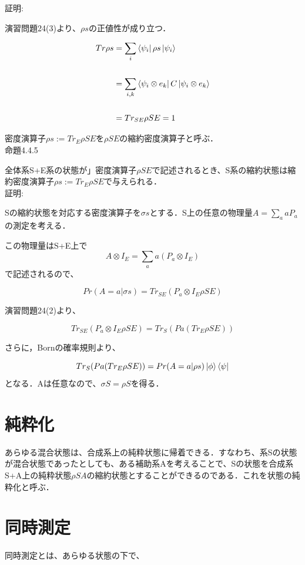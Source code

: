 \documentclass[xelatex,ja=standard,jafont=noto]{bxjsarticle}
\begin{document}
    証明:
    
    演習問題24(3)より、$\rho s$の正値性が成り立つ．
    
    \begin{equation}
        \begin{aligned}
            Tr \rho s&=\sum_{i}\bra{\psi_{i}}\rho s\ket{\psi_{i}}\\
            \\
            &=\sum_{i,k}\bra{\psi_{i}\otimes e_{k}}C\ket{\psi_{i}\otimes e_{k}}\\
            \\
            &=Tr_{SE}\rho SE=1
        \end{aligned}
    \end{equation}
    
密度演算子$\rho s:=Tr_{E}\rho SE$を$\rho SE$の縮約密度演算子と呼ぶ．\\


命題4.4.5

全体系S+E系の状態が」密度演算子$\rho SE$で記述されるとき、S系の縮約状態は縮約密度演算子$\rho s:=Tr_{E}\rho SE$で与えられる．\\

証明:

Sの縮約状態を対応する密度演算子を$\sigma s$とする．S上の任意の物理量$A=\sum_{a}aP_{a}$の測定を考える．

この物理量はS+E上で
\begin{equation}
    A\otimes I_{E}=\sum_{a}a(P_{a}\otimes　I_{E})
\end{equation}
で記述されるので、


\begin{equation}
    Pr(A=a|\sigma s)=Tr_{SE}(P_{a}\otimes　I_{E}\rho SE)
\end{equation}

演習問題24(2)より、

\begin{equation}
    Tr_{SE}(P_{a}\otimes　I_{E}\rho SE)=Tr_{S}(P{a}(Tr_{E}\rho SE))
\end{equation}

さらに，Bornの確率規則より、

\begin{equation}
    Tr_{S}(P{a}(Tr_{E}\rho SE))=Pr(A=a|\rho s)\ket{\phi}\bra{\psi}
\end{equation}
となる．Aは任意なので、$\sigma S=\rho S$を得る．\\


\section{純粋化}

あらゆる混合状態は、合成系上の純粋状態に帰着できる．すなわち、系Sの状態が混合状態であったとしても、ある補助系Aを考えることで、Sの状態を合成系S+A上の純粋状態$\rho SA$の縮約状態とすることができるのである．これを状態の純粋化と呼ぶ．


\section{同時測定}
同時測定とは、あらゆる状態の下で、
\end{document}
